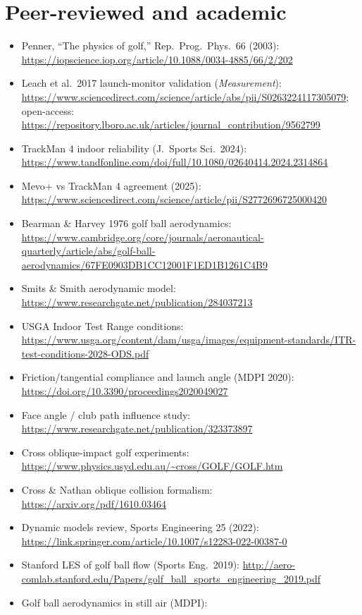 \section{Peer-reviewed and academic}
\begin{itemize}\small
\item Penner, ``The physics of golf,'' Rep.\ Prog.\ Phys.\ 66 (2003):
  \url{https://iopscience.iop.org/article/10.1088/0034-4885/66/2/202}
\item Leach et al.\ 2017 launch-monitor validation (\emph{Measurement}):
  \url{https://www.sciencedirect.com/science/article/abs/pii/S0263224117305079};
  open-access:
  \url{https://repository.lboro.ac.uk/articles/journal_contribution/9562799}
\item TrackMan 4 indoor reliability (J.\ Sports Sci.\ 2024):
  \url{https://www.tandfonline.com/doi/full/10.1080/02640414.2024.2314864}
\item Mevo+ vs TrackMan 4 agreement (2025):
  \url{https://www.sciencedirect.com/science/article/pii/S2772696725000420}
\item Bearman \& Harvey 1976 golf ball aerodynamics:
  \url{https://www.cambridge.org/core/journals/aeronautical-quarterly/article/abs/golf-ball-aerodynamics/67FE0903DB1CC12001F1ED1B1261C4B9}
\item Smits \& Smith aerodynamic model:
  \url{https://www.researchgate.net/publication/284037213}
\item USGA Indoor Test Range conditions:
  \url{https://www.usga.org/content/dam/usga/images/equipment-standards/ITR-test-conditions-2028-ODS.pdf}
\item Friction/tangential compliance and launch angle (MDPI 2020):
  \url{https://doi.org/10.3390/proceedings2020049027}
\item Face angle / club path influence study:
  \url{https://www.researchgate.net/publication/323373897}
\item Cross oblique-impact golf experiments:
  \url{https://www.physics.usyd.edu.au/~cross/GOLF/GOLF.htm}
\item Cross \& Nathan oblique collision formalism:
  \url{https://arxiv.org/pdf/1610.03464}
\item Dynamic models review, Sports Engineering 25 (2022):
  \url{https://link.springer.com/article/10.1007/s12283-022-00387-0}
\item Stanford LES of golf ball flow (Sports Eng.\ 2019):
  \url{http://aero-comlab.stanford.edu/Papers/golf_ball_sports_engineering_2019.pdf}
\item Golf ball aerodynamics in still air (MDPI):

\end{itemize}
